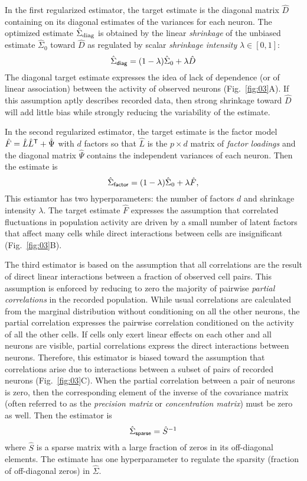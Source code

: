 In the first regularized estimator, the target estimate is the diagonal matrix $\hat D$ containing on its diagonal estimates of the variances for each neuron.  The optimized estimate $\hat\Sigma_{\rm diag}$ is obtained by the linear \emph{shrinkage} of the unbiased estimate $\hat\Sigma_0$ toward $\hat D$ as regulated by scalar \emph{shrinkage intensity} $\lambda \in [0, 1]$:
\begin{equation}
\hat \Sigma_{\sf diag} = (1-\lambda) \hat \Sigma_0 + \lambda \hat D
\end{equation}
The diagonal target estimate expresses the idea of lack of dependence (or of linear association) between the activity of observed neurons (Fig.~\ref{fig:03}A).  If this assumption aptly describes recorded data, then strong shrinkage toward $\hat D$ will add little bias while strongly reducing the variability of the estimate. 

In the second regularized estimator, the target estimate is the factor model $\hat F = \hat L \hat L^{\sf T} + \hat \Psi$ with $d$ factors so that $\hat L$ is the $p\times d$ matrix of \emph{factor loadings} and the diagonal matrix $\hat \Psi$ contains the independent variances of each neuron.
Then the estimate is 
\begin{equation}
\hat \Sigma_{\sf factor} = (1-\lambda) \hat \Sigma_0 + \lambda \hat F,
\end{equation}
This estiamtor has two hyperparameters: the number of factors $d$ and shrinkage intensity $\lambda$. The target estimate $\hat F$ expresses the assumption that correlated fluctuations in population activity are driven by a small number of latent factors that affect many cells while direct interactions between cells are insignificant (Fig.~\ref{fig:03}B).   

The third estimator is based on the assumption that all correlations are the result of direct linear interactions between a fraction of observed cell pairs.  This assumption is enforced by reducing to zero the majority of pairwise \emph{partial correlations} in the recorded population. While usual correlations are calculated from the marginal distribution without conditioning on all the other neurons, the partial correlation expresses the pairwise correlation conditioned on the activity of all the other cells.  If cells only exert linear effects on each other and all neurons are visible, partial correlations express the direct interactions between neurons. Therefore, this estimator is biased toward the assumption that correlations arise due to interactions between a subset of pairs of recorded neurons (Fig.~\ref{fig:03}C). When the partial correlation between a pair of neurons is zero, then the corresponding element of the inverse of the covariance matrix (often referred to as the \emph{precision matrix} or \emph{concentration matrix}) must be zero as well. Then the estimator is 
\begin{equation}
\hat\Sigma_{\sf sparse} = \hat S^{-1}
\end{equation}
where $\hat S$ is a sparse matrix with a large fraction of zeros in its off-diagonal elements. The estimate has one hyperparameter to regulate the sparsity (fraction of off-diagonal zeros) in $\hat\Sigma$.


